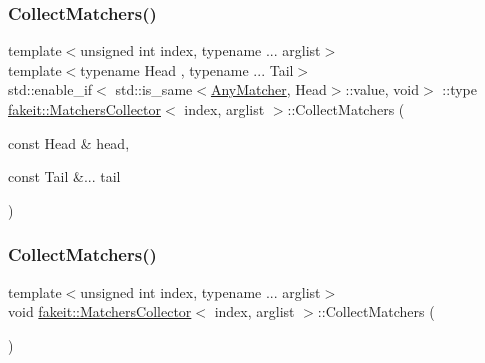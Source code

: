 \mbox{\label{classfakeit_1_1MatchersCollector_a8e7edbff22c9d33238d1e16af8f23b6f}} 
\subsubsection{\texorpdfstring{CollectMatchers()}{CollectMatchers()}\hspace{0.1cm}{\footnotesize\ttfamily [7/63]}}
{\footnotesize\ttfamily template$<$unsigned int index, typename ... arglist$>$ \\
template$<$typename Head , typename ... Tail$>$ \\
std\+::enable\+\_\+if$<$ std\+::is\+\_\+same$<$\mbox{\hyperlink{structfakeit_1_1AnyMatcher}{Any\+Matcher}}, Head$>$\+::value, void$>$ \+::type \mbox{\hyperlink{classfakeit_1_1MatchersCollector}{fakeit\+::\+Matchers\+Collector}}$<$ index, arglist $>$\+::Collect\+Matchers (\begin{DoxyParamCaption}\item[{const Head \&}]{head,  }\item[{const Tail \&...}]{tail }\end{DoxyParamCaption})\hspace{0.3cm}{\ttfamily [inline]}}

\mbox{\label{classfakeit_1_1MatchersCollector_a2d9a08a347c3915daa33f307a274f13c}} 
\subsubsection{\texorpdfstring{CollectMatchers()}{CollectMatchers()}\hspace{0.1cm}{\footnotesize\ttfamily [8/63]}}
{\footnotesize\ttfamily template$<$unsigned int index, typename ... arglist$>$ \\
void \mbox{\hyperlink{classfakeit_1_1MatchersCollector}{fakeit\+::\+Matchers\+Collector}}$<$ index, arglist $>$\+::Collect\+Matchers (\begin{DoxyParamCaption}{ }\end{DoxyParamCaption})\hspace{0.3cm}{\ttfamily [inline]}}

